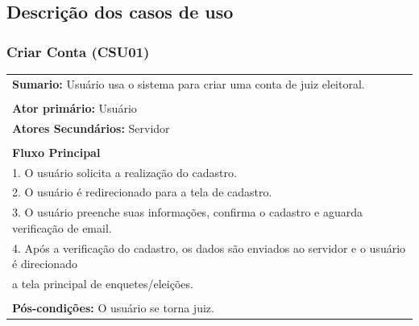 \documentclass[a4paper,12pt]{article}
\begin{document}
\subsection*{Descrição dos casos de uso}
\markright{}

\begin{center}
{\subsubsection*{Criar Conta (CSU01)}}
\end{center}
\markright{}
\begin{tabular}{|l|}\hline
	{\textbf{Sumario:}} Usuário usa o sistema para criar uma conta de juiz eleitoral. \\\\
	{\textbf{Ator primário:}} Usuário \\
	{\textbf{Atores Secundários:}} Servidor\\\\
	{\textbf{Fluxo Principal}}\\
	1. O usuário solicita a realização do cadastro.\\
	2. O usuário é redirecionado para a tela de cadastro. \\
	3. O usuário preenche suas informações, confirma o cadastro e aguarda verificação de email.\\
	4. Após a verificação do cadastro, os dados são enviados ao servidor e o usuário é direcionado\\ a tela principal de enquetes/eleições.\\\\
	{\textbf{Pós-condições:}} O usuário se torna juiz.\\
	\hline
\end{tabular}
\end{document}
